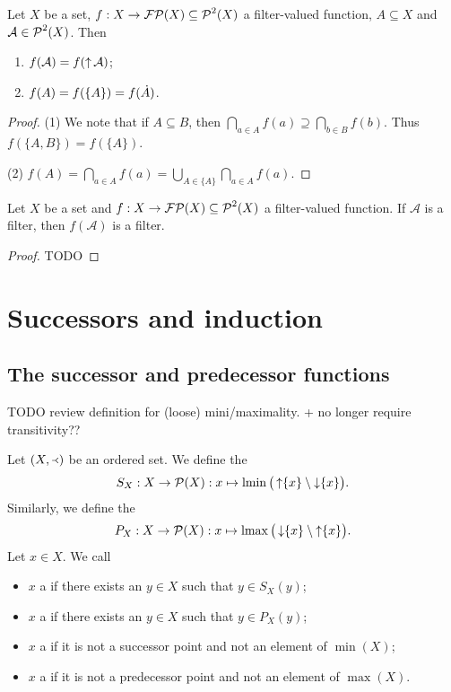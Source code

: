 \begin{lemma}
Let $X$ be a set, $f: X\to \operatorname{\mathcal{FP}}(X) \subseteq \operatorname{\mathcal{P}}^2(X)$ a filter-valued function, $A\subseteq X$ and $\mathcal{A}\in\operatorname{\mathcal{P}}^2(X)$. Then
\begin{enumerate}
\item $f(\mathcal{A}) = f(\operatorname{\uparrow}\mathcal{A})$;
\item $f(A) = f(\{A\}) = f(\dot{A})$.
\end{enumerate}
\end{lemma}
\begin{proof}
(1) We note that if $A\subseteq B$, then $\bigcap_{a\in A} f(a) \supseteq \bigcap_{b\in B} f(b)$. Thus $f(\{A,B\}) = f(\{A\})$.

(2) $f(A) = \bigcap_{a\in A} f(a) = \bigcup_{A\in\{A\}}\bigcap_{a\in A} f(a)$.
\end{proof}

\begin{proposition}
Let $X$ be a set and $f: X\to \operatorname{\mathcal{FP}}(X) \subseteq \operatorname{\mathcal{P}}^2(X)$ a filter-valued function. If $\mathcal{A}$ is a filter, then $f(\mathcal{A})$ is a filter.
\end{proposition}
\begin{proof}
TODO
\end{proof}

\chapter{Successors and induction}
\section{The successor and predecessor functions}

TODO review definition for (loose) mini/maximality. + no longer require transitivity??

\begin{definition}
Let $\left( X,\Yleft \right)$ be an ordered set. We define the 
\[ S_X: X \to \operatorname{\mathcal{P}}(X): x\mapsto \operatorname{lmin}\big(\operatorname{\uparrow}\{x\}\setminus \operatorname{\downarrow}\{x\}\big). \]
Similarly, we define the 
\[ P_X: X\to \operatorname{\mathcal{P}}(X): x\mapsto \operatorname{lmax}\big(\operatorname{\downarrow}\{x\}\setminus \operatorname{\uparrow}\{x\}\big). \]
Let $x\in X$. We call
\begin{itemize}
\item $x$ a  if there exists an $y\in X$ such that $y\in S_X(y)$;
\item $x$ a  if there exists an $y\in X$ such that $y\in P_X(y)$;
\item $x$ a  if it is not a successor point and not an element of $\min(X)$;
\item $x$ a  if it is not a predecessor point and not an element of $\max(X)$.
\end{itemize}
\end{definition}

